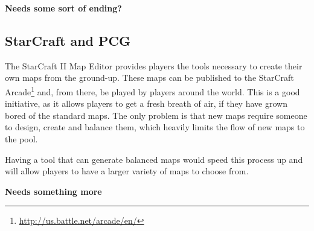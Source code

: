 
\textbf{Needs some sort of ending?}

\subsection{StarCraft and PCG}
\label{Intro_StarCraft_PCG}

The StarCraft II Map Editor provides players the tools necessary to create their own maps from the ground-up. These maps can be published to the StarCraft Arcade\footnote{\url{http://us.battle.net/arcade/en/}} and, from there, be played by players around the world. This is a good initiative, as it allows players to get a fresh breath of air, if they have grown bored of the standard maps. The only problem is that new maps require someone to design, create and balance them, which heavily limits the flow of new maps to the pool.

Having a tool that can generate balanced maps would speed this process up and will allow players to have a larger variety of maps to choose from.

\textbf{Needs something more}